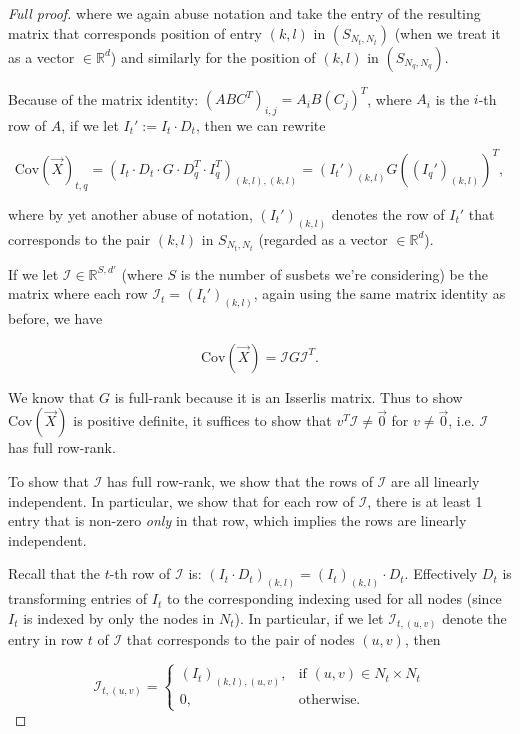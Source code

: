 \documentclass{article}
\theoremstyle{definition}
\newcommand{\Cov}{\mathrm{Cov}}
\newcommand{\R}{\mathbb{R}}
\newcommand{\X}{\vec{X}}
\newcommand{\I}{\mathcal{I}}
\begin{document}
\begin{proof}[Full proof]
where we again abuse notation and take the entry of the resulting matrix that corresponds position of entry $(k,l)$ in $ \left( S_{N_t, N_t} \right)$ (when we treat it as a vector $\in \R^d$) and similarly for the position of $(k,l)$ in $\left( S_{N_q, N_q} \right)$.

Because of the matrix identity: $\left( ABC^T \right)_{i,j} = A_i B (C_j)^T$, where $A_i$ is the $i$-th row of $A$, if we let $I_t' := I_t \cdot D_t$, then we can rewrite 

$$\Cov(\vec{X})_{t, q} = \left( I_t \cdot D_t \cdot G \cdot D_q^T \cdot I_q^T \right)_{(k,l), (k,l)} = (I_t')_{(k,l)} G \left( (I_q')_{(k,l)} \right)^T,$$

where by yet another abuse of notation, $(I_t')_{(k,l)}$ denotes the row of $I_t'$ that corresponds to the pair $(k,l)$ in $S_{N_t, N_t}$ (regarded as a vector $\in \R^d$). 

If we let $\I \in \R^{S, d'}$ (where $S$ is the number of susbets we're considering) be the matrix where each row $\I_t = (I_t')_{(k,l)}$, again using the same matrix identity as before, we have 

$$\Cov(\X) = \I G \I^T.$$

{\color{blue} We know that $G$ is full-rank because it is an Isserlis matrix. } Thus to show $\Cov(\X)$ is positive definite, it suffices to show that $v^T \I \neq \vec{0}$ for $v \neq \vec{0}$, i.e. $\I$ has full row-rank. 

To show that $\I$ has full row-rank, we show that the rows of $\I$ are all linearly independent. In particular, we show that for each row of $\I$, there is at least 1 entry that is non-zero \emph{only} in that row, which implies the rows are linearly independent. 

Recall that the $t$-th row of $\I$ is: $(I_t \cdot D_t)_{(k,l)} = (I_t)_{(k,l)} \cdot D_t$. Effectively $D_t$ is transforming entries of $I_t$ to the corresponding indexing used for all nodes (since $I_t$ is indexed by only the nodes in $N_t$). In particular, if we let $\I_{t, (u,v)}$ denote the entry in row $t$ of $\I$ that corresponds to the pair of nodes $(u,v)$, then 

\begin{equation}
\I_{t, (u,v)} =
\begin{cases}
    (I_t)_{(k,l), (u,v)},& \text{if } (u,v) \in N_t \times N_t \\
    0,              & \text{otherwise.}
\end{cases}
\end{equation}


\end{proof}
\end{document}
